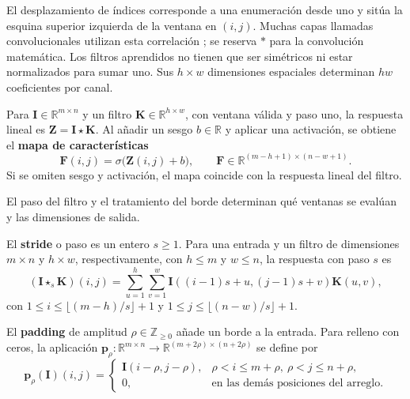 El desplazamiento de índices corresponde a una enumeración desde uno y sitúa la esquina superior izquierda de la ventana en $(i,j)$. Muchas capas llamadas convolucionales utilizan esta correlación \cite{Goodfellow-et-al-2016}; se reserva $\ast$ para la convolución matemática. Los filtros aprendidos no tienen que ser simétricos ni estar normalizados para sumar uno. Sus $h\times w$ dimensiones espaciales determinan $hw$ coeficientes por canal.

\begin{definition}
\label{def:mapa-caracteristicas}
Para $\mathbf I\in\mathbb R^{m\times n}$ y un filtro $\mathbf K\in\mathbb R^{h\times w}$, con ventana válida y paso uno, la respuesta lineal es $\mathbf Z=\mathbf I\star\mathbf K$. Al añadir un sesgo $b\in\mathbb R$ y aplicar una activación, se obtiene el \textbf{mapa de características}
\[
\mathbf F(i,j)=\sigma\bigl(\mathbf Z(i,j)+b\bigr),
\qquad \mathbf F\in\mathbb R^{(m-h+1)\times(n-w+1)}.
\]
Si se omiten sesgo y activación, el mapa coincide con la respuesta lineal del filtro.
\end{definition}

El paso del filtro y el tratamiento del borde determinan qué ventanas se evalúan y las dimensiones de salida.

\begin{definition}[Stride]
\label{def:stride}
El \textbf{stride} o paso es un entero $s\geq1$. Para una entrada y un filtro de dimensiones $m\times n$ y $h\times w$, respectivamente, con $h\leq m$ y $w\leq n$, la respuesta con paso $s$ es
\[
(\mathbf I\star_s\mathbf K)(i,j)
=\sum_{u=1}^{h}\sum_{v=1}^{w}
\mathbf I((i-1)s+u,(j-1)s+v)\mathbf K(u,v),
\]
con $1\leq i\leq\lfloor(m-h)/s\rfloor+1$ y $1\leq j\leq\lfloor(n-w)/s\rfloor+1$.
\end{definition}

\begin{definition}[Padding]
\label{def:padding}
El \textbf{padding} de amplitud $\rho\in\mathbb Z_{\geq0}$ añade un borde a la entrada. Para relleno con ceros, la aplicación $\mathbf p_\rho:\mathbb R^{m\times n}\to\mathbb R^{(m+2\rho)\times(n+2\rho)}$ se define por
\[
\mathbf p_\rho(\mathbf I)(i,j)=
\begin{cases}
\mathbf I(i-\rho,j-\rho),&\rho<i\leq m+\rho,\ \rho<j\leq n+\rho,\\
0,&\text{en las demás posiciones del arreglo.}
\end{cases}
\]
\end{definition}

